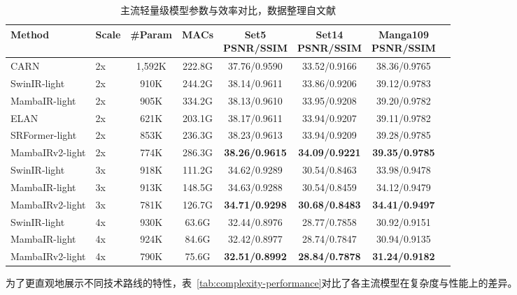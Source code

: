 \begin{table}[htbp]
  \centering
  \caption{主流轻量级模型参数与效率对比，数据整理自文献\cite{ref21-guo2024mambaIRv2}}
  \label{tab:lightweight-compare}
  \small
  {\setlength{\tabcolsep}{4pt}
  \begin{tabular}{llcccccc}
    \toprule
    \textbf{Method} & \textbf{Scale} & \textbf{\#Param} & \textbf{MACs} & \makecell{\textbf{Set5}\\PSNR/SSIM} & \makecell{\textbf{Set14}\\PSNR/SSIM} & \makecell{\textbf{Manga109}\\PSNR/SSIM} \\
    \midrule
    CARN             & 2x & 1,592K & 222.8G & 37.76/0.9590 & 33.52/0.9166 & 38.36/0.9765 \\
    SwinIR-light     & 2x & 910K   & 244.2G & 38.14/0.9611 & 33.86/0.9206 & 39.12/0.9783 \\
    MambaIR-light    & 2x & 905K   & 334.2G & 38.13/0.9610 & 33.95/0.9208 & 39.20/0.9782 \\
    ELAN             & 2x & 621K   & 203.1G & 38.17/0.9611 & 33.94/0.9207 & 39.11/0.9782 \\
    SRFormer-light   & 2x & 853K   & 236.3G & 38.23/0.9613 & 33.94/0.9209 & 39.28/0.9785 \\
    MambaIRv2-light  & 2x & 774K   & 286.3G & \textbf{38.26/0.9615} & \textbf{34.09/0.9221} & \textbf{39.35/0.9785} \\
    \midrule
    SwinIR-light     & 3x & 918K   & 111.2G & 34.62/0.9289 & 30.54/0.8463 & 33.98/0.9478 \\
    MambaIR-light    & 3x & 913K   & 148.5G & 34.63/0.9288 & 30.54/0.8459 & 34.12/0.9479 \\
    MambaIRv2-light  & 3x & 781K   & 126.7G & \textbf{34.71/0.9298} & \textbf{30.68/0.8483} & \textbf{34.41/0.9497} \\
    \midrule
    SwinIR-light     & 4x & 930K   & 63.6G  & 32.44/0.8976 & 28.77/0.7858 & 30.92/0.9151 \\
    MambaIR-light    & 4x & 924K   & 84.6G  & 32.42/0.8977 & 28.74/0.7847 & 30.94/0.9135 \\
    MambaIRv2-light  & 4x & 790K   & 75.6G  & \textbf{32.51/0.8992} & \textbf{28.84/0.7878} & \textbf{31.24/0.9182} \\
    \bottomrule
  \end{tabular}
  }
\end{table}

为了更直观地展示不同技术路线的特性，表~\ref{tab:complexity-performance}对比了各主流模型在复杂度与性能上的差异。

